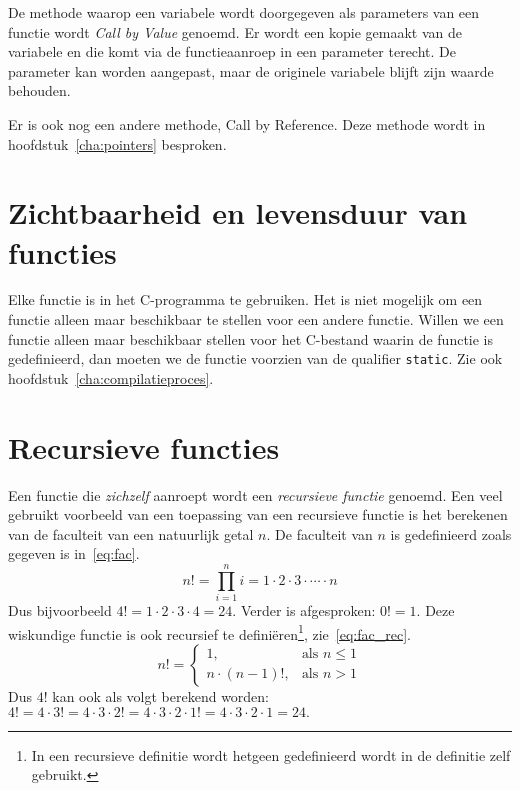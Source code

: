 \begin{infobox}
De methode waarop een variabele wordt doorgegeven als parameters van een functie wordt \textsl{Call by Value} genoemd. Er wordt een kopie gemaakt van de variabele en die komt via de functieaanroep in een parameter terecht. De parameter kan worden aangepast, maar de originele variabele blijft zijn waarde behouden.

Er is ook nog een andere methode, Call by Reference. Deze methode wordt in hoofdstuk~\ref{cha:pointers} besproken.
\end{infobox}

\section{Zichtbaarheid en levensduur van functies}
Elke functie is in het C-programma te gebruiken. Het is niet mogelijk om een functie alleen maar beschikbaar te stellen voor een andere functie. Willen we een functie alleen maar beschikbaar stellen voor het C-bestand waarin de functie is gedefinieerd, dan moeten we de functie voorzien van de qualifier \texttt{static}. Zie ook hoofdstuk~\ref{cha:compilatieproces}.


\section{Recursieve functies}
Een functie die \textsl{zichzelf} aanroept wordt een \textsl{recursieve functie} genoemd.
Een veel gebruikt voorbeeld van een toepassing van een recursieve functie is het berekenen van de faculteit van een natuurlijk getal $n$.
De faculteit van $n$ is gedefinieerd zoals gegeven is in~\eqref{eq:fac}.
\begin{equation}
\label{eq:fac}
	n! = \prod_{i=1}^{n} i = 1 \cdot{} 2 \cdot{} 3 \cdot{} \cdots{} \cdot{} n
\end{equation} 
Dus bijvoorbeeld $4! = 1 \cdot{} 2 \cdot{} 3 \cdot 4 = 24$.
Verder is afgesproken: $0! = 1$.
Deze wiskundige functie is ook recursief te definiëren\footnote{%
	In een recursieve definitie wordt hetgeen gedefinieerd wordt in de definitie zelf gebruikt.
}, zie~\eqref{eq:fac_rec}.
\begin{equation}
\label{eq:fac_rec}
	n! =
	\begin{cases}
		1, & \text{als $n \leq 1$}\\
		n \cdot{} (n - 1)!, & \text{als $n > 1$}
	\end{cases}
\end{equation} 
Dus $4!$ kan ook als volgt berekend worden: $4! = 4 \cdot{} 3! = 4 \cdot{} 3 \cdot{} 2! = 4 \cdot{} 3 \cdot{} 2 \cdot 1! = 4 \cdot{} 3 \cdot{} 2 \cdot 1 = 24.$


